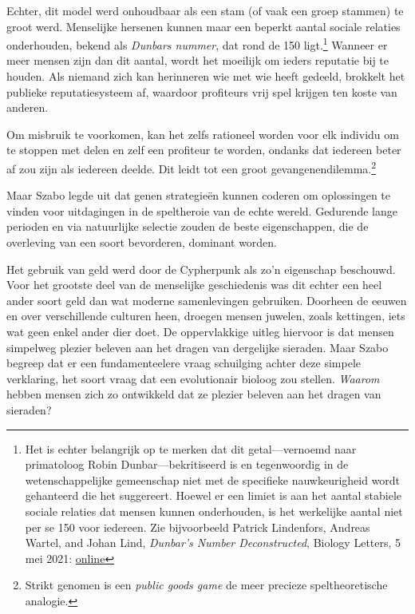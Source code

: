 \documentclass[
  a5paper,
  smalldemyvopaper,11pt,twoside,onecolumn,openright,extrafontsizes,
hidelinks]{memoir}
\begin{document}
Echter, dit model werd onhoudbaar als een stam (of vaak een groep
stammen) te groot werd. Menselijke hersenen kunnen maar een beperkt
aantal sociale relaties onderhouden, bekend als \emph{Dunbars nummer},
dat rond de 150 ligt.\footnote{Het is echter belangrijk op te merken dat
  dit getal---vernoemd naar primatoloog Robin Dunbar---bekritiseerd is
  en tegenwoordig in de wetenschappelijke gemeenschap niet met de
  specifieke nauwkeurigheid wordt gehanteerd die het suggereert. Hoewel
  er een limiet is aan het aantal stabiele sociale relaties dat mensen
  kunnen onderhouden, is het werkelijke aantal niet per se 150 voor
  iedereen. Zie bijvoorbeeld Patrick Lindenfors, Andreas Wartel, and
  Johan Lind, \emph{Dunbar's Number Deconstructed}, Biology Letters, 5
  mei 2021:
  \href{https://royalsocietypublishing.org/doi/10.1098/rsbl.2021.0158}{online}}
Wanneer er meer mensen zijn dan dit aantal, wordt het moeilijk om ieders
reputatie bij te houden. Als niemand zich kan herinneren wie met wie
heeft gedeeld, brokkelt het publieke reputatiesysteem af, waardoor
profiteurs vrij spel krijgen ten koste van anderen.

Om misbruik te voorkomen, kan het zelfs rationeel worden voor elk
individu om te stoppen met delen en zelf een profiteur te worden,
ondanks dat iedereen beter af zou zijn als iedereen deelde. Dit leidt
tot een groot gevangenendilemma.\footnote{Strikt genomen is een
  \emph{public goods game} de meer precieze speltheoretische analogie.}

Maar Szabo legde uit dat genen strategieën kunnen coderen om oplossingen
te vinden voor uitdagingen in de speltheroie van de echte wereld.
Gedurende lange perioden en via natuurlijke selectie zouden de beste
eigenschappen, die de overleving van een soort bevorderen, dominant
worden.

Het gebruik van geld werd door de Cypherpunk als zo'n eigenschap
beschouwd. Voor het grootste deel van de menselijke geschiedenis was dit
echter een heel ander soort geld dan wat moderne samenlevingen
gebruiken. Doorheen de eeuwen en over verschillende culturen heen,
droegen mensen juwelen, zoals kettingen, iets wat geen enkel ander dier
doet. De oppervlakkige uitleg hiervoor is dat mensen simpelweg plezier
beleven aan het dragen van dergelijke sieraden. Maar Szabo begreep dat
er een fundamenteelere vraag schuilging achter deze simpele verklaring,
het soort vraag dat een evolutionair bioloog zou stellen. \emph{Waarom}
hebben mensen zich zo ontwikkeld dat ze plezier beleven aan het dragen
van sieraden?
\end{document}
